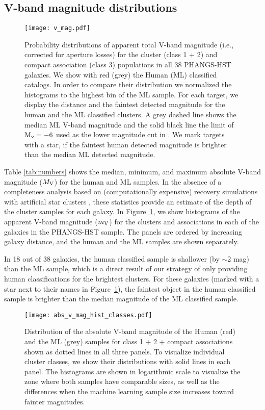 \documentclass[]{aastex631}
\begin{document}
\subsection{V-band magnitude distributions}\label{ssect:v_mag}
%
\begin{figure*} 
\texttt{[image: v\_mag.pdf]}
 \caption{Probability distributions of apparent total V-band magnitude (i.e., corrected for aperture losses) for the cluster (class 1 + 2) and compact association (class 3) populations in all  38 PHANGS-HST galaxies. We show with red (grey) the Human (ML) classified catalogs. In order to compare their distribution we normalized the histograms to the highest bin of the ML sample. For each target, we display the distance and the faintest detected magnitude for the human and the ML classified clusters. A grey dashed line shows the median ML V-band magnitude and the solid black line the limit of ${\rm M_v=-6}$ used as the lower magnitude cut in \citet{adamo_legacy_2017}. We mark targets with a star, if the faintest human detected magnitude is brighter than the median ML detected magnitude.}
 \label{fig:v_mag_panel}
\end{figure*}
%
Table \ref{tab:numbers} shows the median, minimum, and maximum absolute V-band magnitude ($M_{\rm V}$) for the human and ML samples.  In the absence of a completeness analysis based on (computationally expensive) recovery simulations with artificial star clusters \citep[e.g.][]{mayya08, adamo_legacy_2017, messa_young_2018, linden_massive_2021, linden_star_2022, tang_cluster_2023}, these statistics provide an estimate of the depth of the cluster samples for each galaxy. In Figure~\ref{fig:v_mag_panel}, we show histograms of the apparent V-band magnitude ($m_{\rm V}$) for the clusters and associations in each of the galaxies in the PHANGS-HST sample. The panels are ordered by increasing galaxy distance, and the human and the ML samples are shown separately.

In 18 out of 38 galaxies, the human classified sample is shallower (by $\sim$2 mag) than the ML sample, which is a direct result of our strategy of only providing human classifications for the brightest clusters. For these galaxies (marked with a star next to their names in Figure~\ref{fig:v_mag_panel}), the faintest object in the human classified sample is brighter than the median magnitude of the ML classified sample. 
%
\begin{figure} 
\texttt{[image: abs\_v\_mag\_hist\_classes.pdf]}
 \caption{Distribution of the absolute V-band magnitude of the Human (red) and the ML (grey) samples for class 1 + 2 + compact associations shown as dotted lines in all three panels. To visualize individual cluster classes, we show their distributions with solid lines in each panel. The histograms are shown in logarithmic scale to visualize the zone where both samples have comparable sizes, as well as the differences when the machine learning sample size increases toward fainter magnitudes.}
 \label{fig:v_abs_mag}
\end{figure}
%
\end{document}

